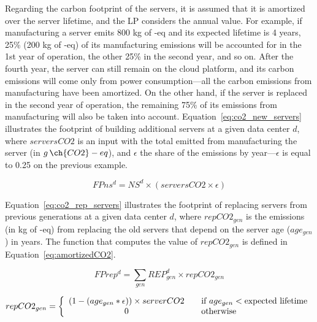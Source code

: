 Regarding the carbon footprint of the servers, it is assumed that it is amortized over the server lifetime, and the LP considers the annual value. For example, if manufacturing a server emits 800 kg of -eq and its expected lifetime is 4 years, 25\% (200 kg of -eq) of its manufacturing emissions will be accounted for in the 1st year of operation, the other 25\% in the second year, and so on. After the fourth year, the server can still remain on the cloud platform, and its carbon emissions will come only from power consumption---all the carbon emissions from manufacturing have been amortized. On the other hand, if the server is replaced in the second year of operation, the remaining 75\%  of its emissions from manufacturing will also be taken into account. Equation~\eqref{eq:co2_new_servers} illustrates the footprint of building additional servers at a given data center $d$, where $serversCO2$ is an input with the total  emitted from manufacturing the server (in $g\,\ch{CO2}-eq$), and $\epsilon$ the share of the emissions by year---$\epsilon$ is equal to 0.25 on the previous example.

\begin{equation} \label{eq:co2_new_servers}
FPns^d = NS^d \times (serversCO2 \times \epsilon)	
\end{equation}

Equation~\eqref{eq:co2_rep_servers} illustrates the footprint of replacing servers from previous generations at a given data center $d$, where $repCO2_{gen}$ is the emissions (in kg of -eq) from replacing the old servers that depend on the server age ($age_{gen}$) in years. The function that computes the value of  $repCO2_{gen}$  is defined in Equation~\eqref{eq:amortizedCO2}.

\begin{equation} \label{eq:co2_rep_servers}
FPrep^d = \sum_{gen} REP_{gen}^d  \times repCO2_{gen}
\end{equation}


\begin{equation} \label{eq:amortizedCO2}
repCO2_{gen} =  \left\{ 
  \begin{array}{ c l }
    (1 - (age_{gen} * \epsilon)) \times serverCO2   & \quad \textrm{if $age_{gen}$}  <  \textrm{expected lifetime}      \\
    0     & \quad  \textrm{otherwise}   \\
  \end{array}
\right.
\end{equation}


